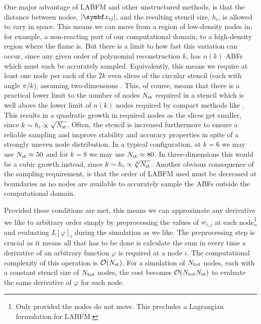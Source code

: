 One major advantage of LABFM and other unstructured methods, is that the distance between nodes, $\abs{\vb{x}_{ij}}$, and the resulting stencil size, $h_i$, is allowed to vary in space. This means we can move from a region of low-density nodes in, for example, a non-reacting part of our computational domain, to a high-density region where the flame is. But there is a limit to how fast this variation can occur, since any given order of polynomial reconstruction $k$, has $n(k)$ ABFs which must each be accurately sampled. Equivalently, this means we require at least one node per each of the $2k$ even slices of the circular stencil (each with angle $\pi / k$), assuming two-dimensions \cite{king2020HighOrderDifference}. This, of course, means that there is a practical lower limit to the number of nodes $N_{\rm{st}}$ required in a stencil which is well above the lower limit of $n(k)$ nodes required by compact methods like \cite{jensen1972FiniteDifferenceTechniques}. This results in a quadratic growth in required nodes as the slices get smaller, since $k \sim h_i \propto \sqrt{N_{\rm{st}}}$. Often, the stencil is increased furthermore to ensure a reliable sampling and improve stability and accuracy properties in spite of a strongly uneven node distribution. In a typical configuration, at $k = 6$ we may use $N_{\rm{st}} \approx 50$ and for $k = 8$ we may use $N_{\rm{st}} \approx 80$. In three-dimensions this would be a cubic growth instead, since $k \sim h_i \propto \sqrt[3]{N_{\rm{st}}}$. Another obvious consequence of the sampling requirement, is that the order of LABFM used must be decreased at boundaries as no nodes are available to accurately sample the ABFs outside the computational domain.

Provided these conditions are met, this means we can approximate any derivative we like to arbitrary order simply by preprocessing the values of $w_{i, j}$ at each node\footnote{Only provided the nodes do not move. This precludes a Lagrangian formulation for LABFM.} and evaluating $L[φ]_i$ during the simulation as we like. The preprocessing step is crucial as it means all that has to be done is calculate the sum in  every time a derivative of an arbitrary function $φ$ is required at a node $i$. The computational complexity of this operation is $\cl{O}(N_{\rm{st}})$. For a simulation of $N_{\rm{tot}}$ nodes, each with a constant stencil size of $N_{\rm{tot}}$ nodes, the cost becomes $\cl{O}(N_{\rm{tot}} N_{\rm{st}})$ to evaluate the same derivative of $φ$ for each node.



